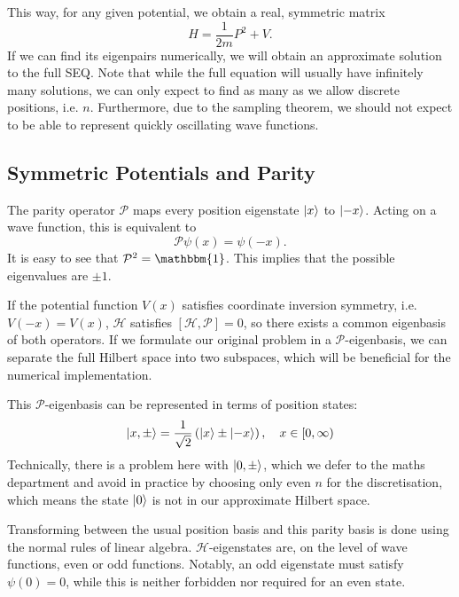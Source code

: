 \documentclass[a4paper,DIV=12,english]{scrartcl}
\begin{document}
This way, for any given potential, we obtain a real, symmetric matrix
\begin{equation}
    H = \frac{1}{2m}P^2 + V.
\end{equation}
If we can find its eigenpairs numerically, we will obtain an approximate solution to the full SEQ. Note that while the full equation will usually have infinitely many solutions, we can only expect to find as many as we allow discrete positions, i.e. $n$. Furthermore, due to the sampling theorem, we should not expect to be able to represent quickly oscillating wave functions.

\subsection{Symmetric Potentials and Parity}
The parity operator $\mathcal{P}$ maps every position eigenstate $\ket{x}$ to $\ket{-x}$. Acting on a wave function, this is equivalent to 
\begin{equation}
    \mathcal{P}\psi(x) = \psi(-x).
\end{equation}
It is easy to see that $\mathcal{P}^2=\mathbbm{1}$. This implies that the possible eigenvalues are $\pm 1$.

If the potential function $V(x)$ satisfies coordinate inversion symmetry, i.e. $V(-x)=V(x)$, $\mathcal{H}$ satisfies $[\mathcal{H},\mathcal{P}] = 0$, so there exists a common eigenbasis of both operators. If we formulate our original problem in a $\mathcal{P}$-eigenbasis, we can separate the full Hilbert space into two subspaces, which will be beneficial for the numerical implementation.

This $\mathcal{P}$-eigenbasis can be represented in terms of position states:
\begin{equation}
\ket{x,\pm} = \frac{1}{\sqrt{2}}\left(\ket{x}\pm \ket{-x}\right), \quad x \in [0, \infty)
\end{equation}
Technically, there is a problem here with $\ket{0,\pm}$, which we defer to the maths department and avoid in practice by choosing only even $n$ for the discretisation, which means the state $\ket{0}$ is not in our approximate Hilbert space.

Transforming between the usual position basis and this parity basis is done using the normal rules of linear algebra. $\mathcal{H}$-eigenstates are, on the level of wave functions, even or odd functions. Notably, an odd eigenstate must satisfy $\psi(0)=0$, while this is neither forbidden nor required for an even state.
\end{document}
